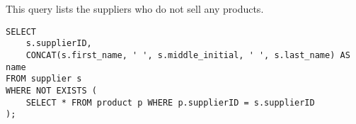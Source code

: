 This query lists the suppliers who do not sell any products.

\begin{lstlisting}
SELECT
    s.supplierID,
    CONCAT(s.first_name, ' ', s.middle_initial, ' ', s.last_name) AS name
FROM supplier s
WHERE NOT EXISTS (
    SELECT * FROM product p WHERE p.supplierID = s.supplierID
);
\end{lstlisting}